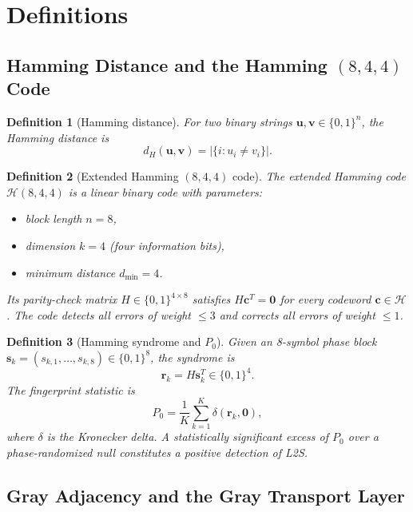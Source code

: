 \documentclass[11pt]{article}
\newtheorem{definition}{Definition}
\begin{document}
\section{Definitions}

\subsection{Hamming Distance and the Hamming $(8,4,4)$ Code}

\begin{definition}[Hamming distance]
For two binary strings $\mathbf{u}, \mathbf{v} \in \{0,1\}^n$, the
\emph{Hamming distance} is
\[
  d_H(\mathbf{u},\mathbf{v}) = \bigl|\{i : u_i \neq v_i\}\bigr|.
\]
\end{definition}

\begin{definition}[Extended Hamming $(8,4,4)$ code]
The extended Hamming code $\mathcal{H}(8,4,4)$ is a linear binary code with
parameters:
\begin{itemize}
\item block length $n = 8$,
\item dimension $k = 4$ (four information bits),
\item minimum distance $d_{\min} = 4$.
\end{itemize}
Its parity-check matrix $H \in \{0,1\}^{4\times 8}$ satisfies $H\mathbf{c}^T = \mathbf{0}$
for every codeword $\mathbf{c} \in \mathcal{H}$.
The code detects all errors of weight $\leq 3$ and corrects all errors of weight
$\leq 1$.
\end{definition}

\begin{definition}[Hamming syndrome and $P_0$]
Given an 8-symbol phase block $\mathbf{s}_k = (s_{k,1},\dots,s_{k,8}) \in
\{0,1\}^8$, the \emph{syndrome} is
\[
  \mathbf{r}_k = H \mathbf{s}_k^T \in \{0,1\}^4.
\]
The \emph{fingerprint statistic} is
\[
  P_0 = \frac{1}{K}\sum_{k=1}^{K} \delta(\mathbf{r}_k, \mathbf{0}),
\]
where $\delta$ is the Kronecker delta. A statistically significant excess of
$P_0$ over a phase-randomized null constitutes a positive detection of L2S.
\end{definition}

\subsection{Gray Adjacency and the Gray Transport Layer}
\end{document}
